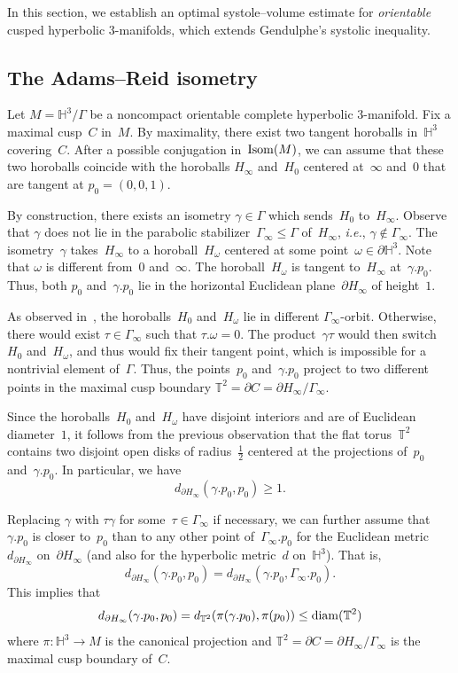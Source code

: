 \documentclass[11pt,reqno]{amsart}
\theoremstyle{definition}
\numberwithin{equation}{section}
\newcommand\T {{\mathbb T}}
\newcommand{\HH}{{\mathbb H}}
\newcommand\ie{{\it i.e.}}
\DeclareMathOperator{\diam}{{\rm diam}}
\DeclareMathOperator{\Isom}{{\rm Isom}}
\numberwithin{equation}{section}
\begin{document}
In this section, we establish an optimal systole--volume estimate for \emph{orientable} cusped hyperbolic $3$-manifolds, which extends Gendulphe's systolic inequality.

\subsection{The Adams--Reid isometry}
Let $M=\HH^3/\Gamma$ be a noncompact orientable complete hyperbolic $3$-manifold.
Fix a maximal cusp~$C$ in~$M$.
By maximality, there exist two tangent horoballs in~$\HH^3$ covering~$C$.
After a possible conjugation in~$\Isom(M)$, we can assume that these two horoballs coincide with the horoballs $H_\infty$ and~$H_0$ centered at~$\infty$ and~$0$ that are tangent at $p_0=(0,0,1)$.

By construction, there exists an isometry $\gamma \in \Gamma$ which sends~$H_0$ to~$H_\infty$.
Observe that $\gamma$ does not lie in the parabolic stabilizer~$\Gamma_\infty \leqslant \Gamma$ of~$H_\infty$, \ie, $\gamma \notin \Gamma_\infty$.
The isometry~$\gamma$ takes~$H_\infty$ to a horoball~$H_\omega$ centered at some point~$\omega \in \partial \HH^3$.
Note that $\omega$ is different from~$0$ and~$\infty$.
The horoball~$H_\omega$ is tangent to~$H_\infty$ at~$\gamma .p_0$.
Thus, both $p_0$ and~$\gamma.p_0$ lie in the horizontal Euclidean plane~$\partial H_\infty$ of height~$1$.

As observed in~\cite{adams_waist}, the horoballs~$H_0$ and~$H_\omega$ lie in different $\Gamma_\infty$-orbit.
Otherwise, there would exist $\tau \in \Gamma_\infty$ such that $\tau.\omega=0$.
The product~$\gamma \tau$ would then switch~$H_0$ and~$H_\omega$, and thus would fix their tangent point, which is impossible for a nontrivial element of~$\Gamma$.
Thus, the points~$p_0$ and~$\gamma.p_0$ project to two different points in the maximal cusp boundary $\T^2 = \partial C = \partial H_\infty / \Gamma_\infty$.


Since the horoballs~$H_0$ and~$H_\omega$ have disjoint interiors and are of Euclidean diameter~$1$, it follows from the previous observation that the flat torus~$\T^2$ contains two disjoint open disks of radius~$\frac{1}{2}$ centered at the projections of~$p_0$ and~$\gamma.p_0$.
In particular, we have
\[
d_{\partial H_\infty}(\gamma .p_0, p_0)  \geq 1.
\]

Replacing $\gamma$ with $\tau \gamma$ for some~$\tau \in \Gamma_\infty$ if necessary, we can further assume that $\gamma .p_0$ is closer to~$p_0$ than to any other point of~$\Gamma_\infty .p_0$ for the Euclidean metric~$d_{\partial H_\infty}$ on~$\partial H_\infty$ (and also for the hyperbolic metric~$d$ on~$\HH^3$).
That is,
\[
d_{\partial H_\infty}(\gamma .p_0, p_0) = d_{\partial H_\infty}(\gamma .p_0, \Gamma_\infty .p_0).
\]
This implies that
\begin{equation} \label{eq:D}
d_{\partial H_\infty}(\gamma .p_0, p_0) = d_{\T^2}(\pi(\gamma .p_0), \pi(p_0)) \leq \diam(\T^2)
\end{equation}
where $\pi:\HH^3 \to M$ is the canonical projection and $\T^2 = \partial C =  \partial H_\infty / \Gamma_\infty$ is the maximal cusp boundary of~$C$.
\end{document}
